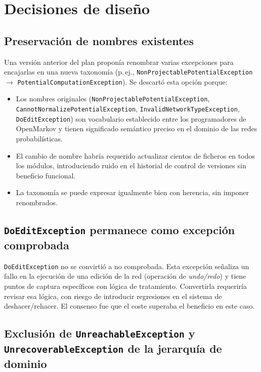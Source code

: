 \documentclass[12pt,a4paper]{article}
\begin{document}
\section{Decisiones de diseño}
\label{sec:decisiones}

\subsection{Preservación de nombres existentes}

Una versión anterior del plan proponía renombrar varias excepciones para
encajarlas en una nueva taxonomía (p.\,ej.,
\texttt{NonProjectablePotentialException} $\to$
\texttt{PotentialComputationException}). Se descartó esta opción porque:

\begin{itemize}
  \item Los nombres originales (\texttt{NonProjectablePotentialException},
    \texttt{CannotNormalizePotentialException}, \texttt{InvalidNetworkTypeException},
    \texttt{DoEditException}) son vocabulario establecido entre los programadores
    de OpenMarkov y tienen significado semántico preciso en el dominio de las
    redes probabilísticas.
  \item El cambio de nombre habría requerido actualizar cientos de ficheros en
    todos los módulos, introduciendo ruido en el historial de control de
    versiones sin beneficio funcional.
  \item La taxonomía se puede expresar igualmente bien con herencia, sin imponer
    renombrados.
\end{itemize}

\subsection{\texttt{DoEditException} permanece como excepción comprobada}

\texttt{DoEditException} no se convirtió a no comprobada. Esta excepción señaliza
un fallo en la ejecución de una edición de la red (operación de
\textit{undo/redo}) y tiene puntos de captura específicos con lógica de
tratamiento. Convertirla requeriría revisar esa lógica, con riesgo de introducir
regresiones en el sistema de deshacer/rehacer. El consenso fue que el coste
superaba el beneficio en este caso.

\subsection{Exclusión de \texttt{UnreachableException} y \texttt{UnrecoverableException} de la jerarquía de dominio}
\end{document}
